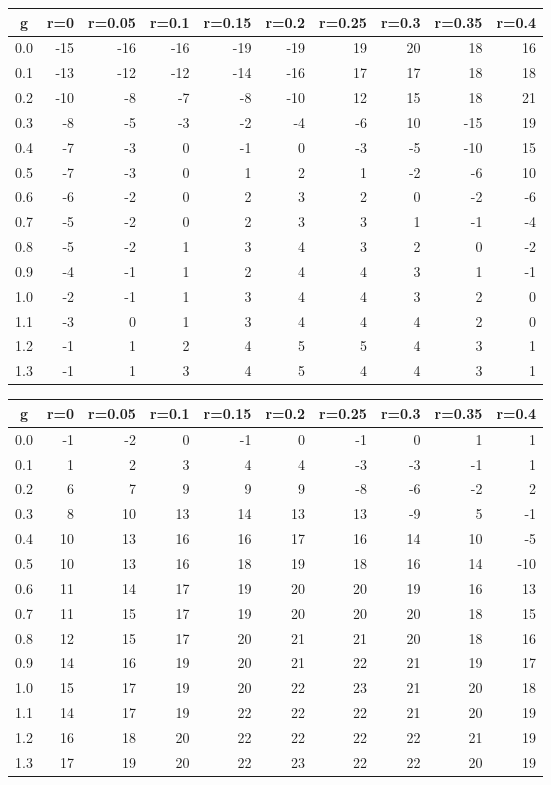 %
\begin{table}[!tbp]
 \begin{center}
 \begin{tabular}{rrrrrrrrrr}\hline\hline
\multicolumn{1}{c}{g}&\multicolumn{1}{c}{r=0}&\multicolumn{1}{c}{r=0.05}&\multicolumn{1}{c}{r=0.1}&\multicolumn{1}{c}{r=0.15}&\multicolumn{1}{c}{r=0.2}&\multicolumn{1}{c}{r=0.25}&\multicolumn{1}{c}{r=0.3}&\multicolumn{1}{c}{r=0.35}&\multicolumn{1}{c}{r=0.4}\tabularnewline
\hline
0.0&-15&-16&-16&-19&-19&19&20& 18&16\tabularnewline
0.1&-13&-12&-12&-14&-16&17&17& 18&18\tabularnewline
0.2&-10& -8& -7& -8&-10&12&15& 18&21\tabularnewline
0.3& -8& -5& -3& -2& -4&-6&10&-15&19\tabularnewline
0.4& -7& -3&  0& -1&  0&-3&-5&-10&15\tabularnewline
0.5& -7& -3&  0&  1&  2& 1&-2& -6&10\tabularnewline
0.6& -6& -2&  0&  2&  3& 2& 0& -2&-6\tabularnewline
0.7& -5& -2&  0&  2&  3& 3& 1& -1&-4\tabularnewline
0.8& -5& -2&  1&  3&  4& 3& 2&  0&-2\tabularnewline
0.9& -4& -1&  1&  2&  4& 4& 3&  1&-1\tabularnewline
1.0& -2& -1&  1&  3&  4& 4& 3&  2& 0\tabularnewline
1.1& -3&  0&  1&  3&  4& 4& 4&  2& 0\tabularnewline
1.2& -1&  1&  2&  4&  5& 5& 4&  3& 1\tabularnewline
1.3& -1&  1&  3&  4&  5& 4& 4&  3& 1\tabularnewline
\hline
\end{tabular}

\end{center}

\end{table}

%
\begin{table}[!tbp]
 \begin{center}
 \begin{tabular}{rrrrrrrrrr}\hline\hline
\multicolumn{1}{c}{g}&\multicolumn{1}{c}{r=0}&\multicolumn{1}{c}{r=0.05}&\multicolumn{1}{c}{r=0.1}&\multicolumn{1}{c}{r=0.15}&\multicolumn{1}{c}{r=0.2}&\multicolumn{1}{c}{r=0.25}&\multicolumn{1}{c}{r=0.3}&\multicolumn{1}{c}{r=0.35}&\multicolumn{1}{c}{r=0.4}\tabularnewline
\hline
0.0&-1&-2& 0&-1& 0&-1& 0& 1&  1\tabularnewline
0.1& 1& 2& 3& 4& 4&-3&-3&-1&  1\tabularnewline
0.2& 6& 7& 9& 9& 9&-8&-6&-2&  2\tabularnewline
0.3& 8&10&13&14&13&13&-9& 5& -1\tabularnewline
0.4&10&13&16&16&17&16&14&10& -5\tabularnewline
0.5&10&13&16&18&19&18&16&14&-10\tabularnewline
0.6&11&14&17&19&20&20&19&16& 13\tabularnewline
0.7&11&15&17&19&20&20&20&18& 15\tabularnewline
0.8&12&15&17&20&21&21&20&18& 16\tabularnewline
0.9&14&16&19&20&21&22&21&19& 17\tabularnewline
1.0&15&17&19&20&22&23&21&20& 18\tabularnewline
1.1&14&17&19&22&22&22&21&20& 19\tabularnewline
1.2&16&18&20&22&22&22&22&21& 19\tabularnewline
1.3&17&19&20&22&23&22&22&20& 19\tabularnewline
\hline
\end{tabular}

\end{center}

\end{table}

